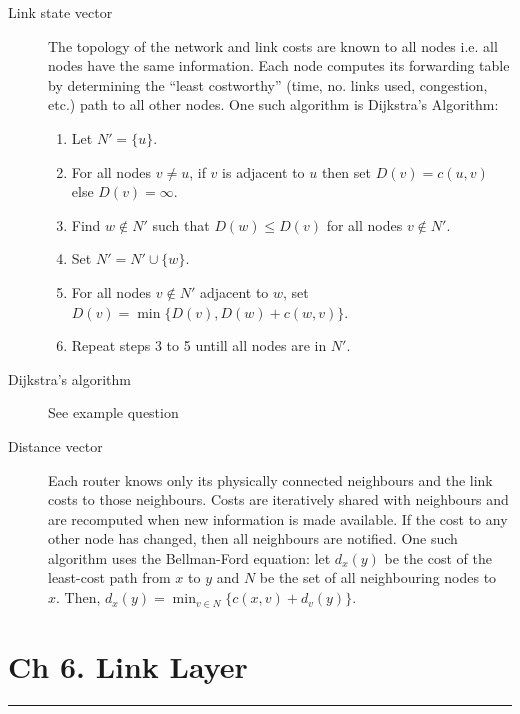 \documentclass{article}
\begin{document}
\begin{description}
    \item[Link state vector] The topology of the network and link costs are known to all nodes i.e.
    all nodes have the same information. Each node computes its forwarding table by determining the
    ``least costworthy'' (time, no. links used, congestion, etc.) path to all other nodes. One such 
    algorithm is Dijkstra's Algorithm:
    \begin{enumerate}
        \item Let $N'=\{u\}$.
        \item For all nodes $v\neq u$, if $v$ is adjacent to $u$ then set $D(v)=c(u,v)$ else $D(v)=\infty$.
        \item Find $w\notin N'$ such that $D(w)\leq D(v)$ for all nodes $v\notin N'.$
        \item Set $N'=N'\cup\{w\}$.
        \item For all nodes $v\notin N'$ adjacent to $w$, set $D(v)=\min\{D(v), D(w)+c(w,v)\}$.
        \item Repeat steps 3 to 5 untill all nodes are in $N'$.
    \end{enumerate}
    
    \item[Dijkstra’s algorithm]
        See example question
    
    \item[Distance vector] Each router knows only its physically connected neighbours and the link
    costs to those neighbours. Costs are iteratively shared with neighbours and are recomputed when
    new information is made available. If the cost to any other node has changed, then all neighbours 
    are notified. One such algorithm uses the Bellman-Ford equation: let $d_x(y)$ be the cost of the
    least-cost path from $x$ to $y$ and $N$ be the set of all neighbouring nodes to $x.$ Then, 
    $d_x(y)=\min_{v\in N}\{c(x,v)+d_v(y)\}$.
\end{description}

\newpage

\section*{Ch 6. Link Layer}
\noindent
\rule{\linewidth}{0.5mm}
\noindent
\end{document}
